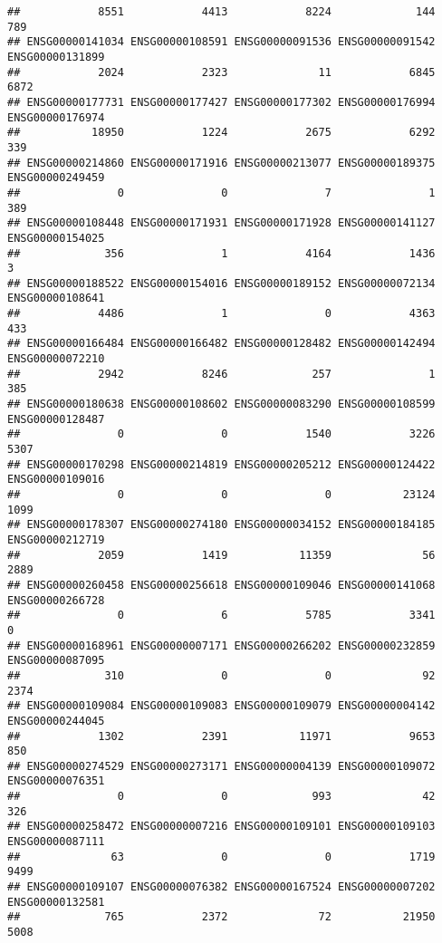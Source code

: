 \documentclass[
]{article}
\begin{document}
\begin{verbatim}
##            8551            4413            8224             144             789 
## ENSG00000141034 ENSG00000108591 ENSG00000091536 ENSG00000091542 ENSG00000131899 
##            2024            2323              11            6845            6872 
## ENSG00000177731 ENSG00000177427 ENSG00000177302 ENSG00000176994 ENSG00000176974 
##           18950            1224            2675            6292             339 
## ENSG00000214860 ENSG00000171916 ENSG00000213077 ENSG00000189375 ENSG00000249459 
##               0               0               7               1             389 
## ENSG00000108448 ENSG00000171931 ENSG00000171928 ENSG00000141127 ENSG00000154025 
##             356               1            4164            1436               3 
## ENSG00000188522 ENSG00000154016 ENSG00000189152 ENSG00000072134 ENSG00000108641 
##            4486               1               0            4363             433 
## ENSG00000166484 ENSG00000166482 ENSG00000128482 ENSG00000142494 ENSG00000072210 
##            2942            8246             257               1             385 
## ENSG00000180638 ENSG00000108602 ENSG00000083290 ENSG00000108599 ENSG00000128487 
##               0               0            1540            3226            5307 
## ENSG00000170298 ENSG00000214819 ENSG00000205212 ENSG00000124422 ENSG00000109016 
##               0               0               0           23124            1099 
## ENSG00000178307 ENSG00000274180 ENSG00000034152 ENSG00000184185 ENSG00000212719 
##            2059            1419           11359              56            2889 
## ENSG00000260458 ENSG00000256618 ENSG00000109046 ENSG00000141068 ENSG00000266728 
##               0               6            5785            3341               0 
## ENSG00000168961 ENSG00000007171 ENSG00000266202 ENSG00000232859 ENSG00000087095 
##             310               0               0              92            2374 
## ENSG00000109084 ENSG00000109083 ENSG00000109079 ENSG00000004142 ENSG00000244045 
##            1302            2391           11971            9653             850 
## ENSG00000274529 ENSG00000273171 ENSG00000004139 ENSG00000109072 ENSG00000076351 
##               0               0             993              42             326 
## ENSG00000258472 ENSG00000007216 ENSG00000109101 ENSG00000109103 ENSG00000087111 
##              63               0               0            1719            9499 
## ENSG00000109107 ENSG00000076382 ENSG00000167524 ENSG00000007202 ENSG00000132581 
##             765            2372              72           21950            5008 

\end{verbatim}
\end{document}
